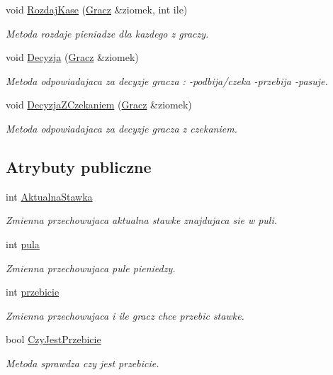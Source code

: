 \begin{DoxyCompactItemize}
void \hyperlink{class_g_r_a_a28a2c64b762a24b489af437c7eef6040}{Rozdaj\-Kase} (\hyperlink{class_gracz}{Gracz} \&ziomek, int ile)
\begin{DoxyCompactList}\small\item\em Metoda rozdaje pieniadze dla kazdego z graczy. \end{DoxyCompactList}\item 
void \hyperlink{class_g_r_a_a08adc6b506a6fc09f75e0cfbe37a383a}{Decyzja} (\hyperlink{class_gracz}{Gracz} \&ziomek)
\begin{DoxyCompactList}\small\item\em Metoda odpowiadajaca za decyzje gracza \-: -\/podbija/czeka -\/przebija -\/pasuje. \end{DoxyCompactList}\item 
void \hyperlink{class_g_r_a_af1183dcbde935bdf4f5ee1d6882b6d80}{Decyzja\-Z\-Czekaniem} (\hyperlink{class_gracz}{Gracz} \&ziomek)
\begin{DoxyCompactList}\small\item\em Metoda odpowiadajaca za decyzje gracza z czekaniem. \end{DoxyCompactList}\end{DoxyCompactItemize}
\subsection*{Atrybuty publiczne}
\begin{DoxyCompactItemize}
\item 
int \hyperlink{class_g_r_a_aa287e248b282a8f5578e7918f4e1677d}{Aktualna\-Stawka}
\begin{DoxyCompactList}\small\item\em Zmienna przechowujaca aktualna stawke znajdujaca sie w puli. \end{DoxyCompactList}\item 
int \hyperlink{class_g_r_a_a4df8e87765364f55e3b0200954c0370a}{pula}
\begin{DoxyCompactList}\small\item\em Zmienna przechowujaca pule pieniedzy. \end{DoxyCompactList}\item 
int \hyperlink{class_g_r_a_aebea0ee71fa4cacd63c9bb60dadbf926}{przebicie}
\begin{DoxyCompactList}\small\item\em Zmienna przechowujaca i ile gracz chce przebic stawke. \end{DoxyCompactList}\item 
bool \hyperlink{class_g_r_a_a971a7f0bc74fcd858d40c3f530c5ef5f}{Czy\-Jest\-Przebicie}
\begin{DoxyCompactList}\small\item\em Metoda sprawdza czy jest przebicie. \end{DoxyCompactList}\end{DoxyCompactItemize}
